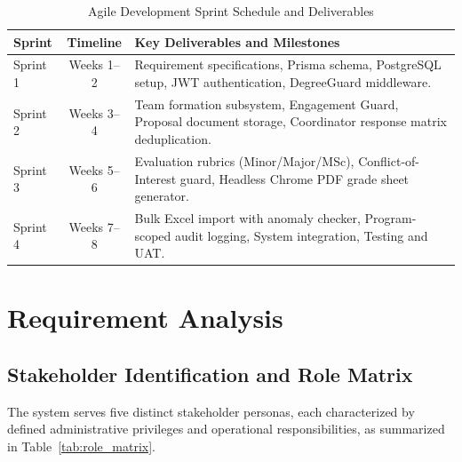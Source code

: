 \begin{table}[H]
\centering
\small
\caption{Agile Development Sprint Schedule and Deliverables}
\label{tab:sprint_schedule}
\vspace{6pt}
\begin{tabularx}{\textwidth}{|l|c|X|}
\hline
\textbf{Sprint} & \textbf{Timeline} & \textbf{Key Deliverables and Milestones} \\
\hline
Sprint 1 & Weeks 1--2 & Requirement specifications, Prisma schema, PostgreSQL setup, JWT authentication, DegreeGuard middleware. \\
\hline
Sprint 2 & Weeks 3--4 & Team formation subsystem, Engagement Guard, Proposal document storage, Coordinator response matrix deduplication. \\
\hline
Sprint 3 & Weeks 5--6 & Evaluation rubrics (Minor/Major/MSc), Conflict-of-Interest guard, Headless Chrome PDF grade sheet generator. \\
\hline
Sprint 4 & Weeks 7--8 & Bulk Excel import with anomaly checker, Program-scoped audit logging, System integration, Testing and UAT. \\
\hline
\end{tabularx}
\end{table}

\section{Requirement Analysis}

\subsection{Stakeholder Identification and Role Matrix}
The system serves five distinct stakeholder personas, each characterized by defined administrative privileges and operational responsibilities, as summarized in Table~\ref{tab:role_matrix}.

